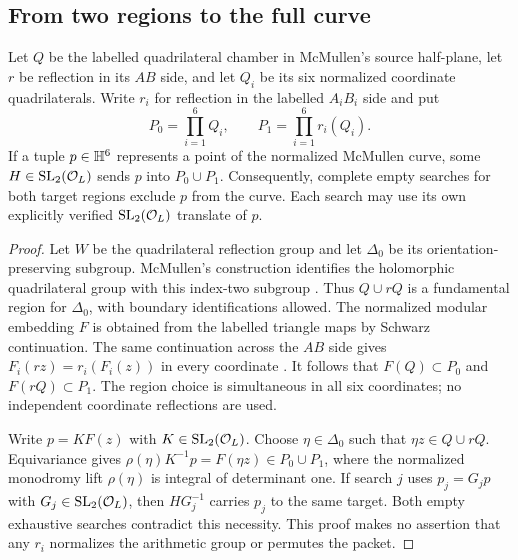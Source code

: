 \subsection{From two regions to the full curve}
\begin{lemma}\label{lem:twochambers}
Let $Q$ be the labelled quadrilateral chamber in McMullen's source
half-plane, let $r$ be reflection in its $AB$ side, and let $Q_i$ be
its six normalized coordinate quadrilaterals. Write $r_i$ for reflection
in the labelled $A_iB_i$ side and put
\[
 P_0=\prod_{i=1}^6 Q_i,\qquad P_1=\prod_{i=1}^6 r_i(Q_i).
\]
If a tuple $p\in\mathbb H^6$ represents a point of the normalized McMullen
curve, some $H\in\operatorname{SL}_2(\mathcal O_L)$ sends $p$ into $P_0\cup P_1$.
Consequently, complete empty searches for both target regions exclude
$p$ from the curve. Each search may use its own explicitly verified
$\operatorname{SL}_2(\mathcal O_L)$ translate of $p$.
\end{lemma}
\begin{proof}
Let $W$ be the quadrilateral reflection group and let $\Delta_0$ be
its orientation-preserving subgroup. McMullen's construction identifies
the holomorphic quadrilateral group with this index-two subgroup
\cite[\S4]{McMullen2026}. Thus $Q\cup rQ$ is a fundamental region
for $\Delta_0$, with boundary identifications allowed. The normalized
modular embedding $F$ is obtained from the labelled triangle maps by
Schwarz continuation. The same continuation across the $AB$ side gives
$F_i(rz)=r_i(F_i(z))$ in every coordinate
\cite[\S6, Theorem~6.3 and the proof of Theorem~1.9]{McMullen2026}.
It follows that $F(Q)\subset P_0$ and $F(rQ)\subset P_1$.
The region choice is simultaneous in all six coordinates; no independent
coordinate reflections are used.

Write $p=KF(z)$ with $K\in\operatorname{SL}_2(\mathcal O_L)$. Choose
$\eta\in\Delta_0$ such that $\eta z\in Q\cup rQ$.
Equivariance gives
$\rho(\eta)K^{-1}p=F(\eta z)\in P_0\cup P_1$,
where the normalized monodromy lift $\rho(\eta)$ is integral of
determinant one. If search $j$ uses $p_j=G_jp$ with
$G_j\in\operatorname{SL}_2(\mathcal O_L)$, then $HG_j^{-1}$ carries $p_j$ to the same
target. Both empty exhaustive searches contradict this necessity.
This proof makes no assertion that any $r_i$ normalizes the arithmetic
group or permutes the packet.
\end{proof}


